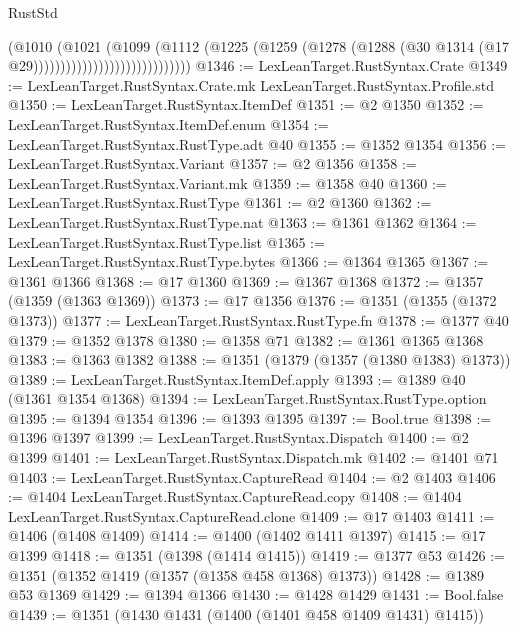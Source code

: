 \begin{lexlean}{RustStd}
\begin{coremodule}
{\begin{coremodule}
{{{{{{{{{{{{{{{{{{{{{{{{{{{{{{{{                                          (@1010
                                            (@1021
                                              (@1099
                                                (@1112
                                                  (@1225
                                                    (@1259
                                                      (@1278
                                                        (@1288
                                                          (@30
                                                            @1314
                                                            (@17 @29)))))))))))))))))))))))))))))
@1346 := LexLeanTarget.RustSyntax.Crate
@1349 := LexLeanTarget.RustSyntax.Crate.mk LexLeanTarget.RustSyntax.Profile.std
@1350 := LexLeanTarget.RustSyntax.ItemDef
@1351 := @2 @1350
@1352 := LexLeanTarget.RustSyntax.ItemDef.enum
@1354 := LexLeanTarget.RustSyntax.RustType.adt @40
@1355 := @1352 @1354
@1356 := LexLeanTarget.RustSyntax.Variant
@1357 := @2 @1356
@1358 := LexLeanTarget.RustSyntax.Variant.mk
@1359 := @1358 @40
@1360 := LexLeanTarget.RustSyntax.RustType
@1361 := @2 @1360
@1362 := LexLeanTarget.RustSyntax.RustType.nat
@1363 := @1361 @1362
@1364 := LexLeanTarget.RustSyntax.RustType.list
@1365 := LexLeanTarget.RustSyntax.RustType.bytes
@1366 := @1364 @1365
@1367 := @1361 @1366
@1368 := @17 @1360
@1369 := @1367 @1368
@1372 := @1357 (@1359 (@1363 @1369))
@1373 := @17 @1356
@1376 := @1351 (@1355 (@1372 @1373))
@1377 := LexLeanTarget.RustSyntax.RustType.fn
@1378 := @1377 @40
@1379 := @1352 @1378
@1380 := @1358 @71
@1382 := @1361 @1365 @1368
@1383 := @1363 @1382
@1388 := @1351 (@1379 (@1357 (@1380 @1383) @1373))
@1389 := LexLeanTarget.RustSyntax.ItemDef.apply
@1393 := @1389 @40 (@1361 @1354 @1368)
@1394 := LexLeanTarget.RustSyntax.RustType.option
@1395 := @1394 @1354
@1396 := @1393 @1395
@1397 := Bool.true
@1398 := @1396 @1397
@1399 := LexLeanTarget.RustSyntax.Dispatch
@1400 := @2 @1399
@1401 := LexLeanTarget.RustSyntax.Dispatch.mk
@1402 := @1401 @71
@1403 := LexLeanTarget.RustSyntax.CaptureRead
@1404 := @2 @1403
@1406 := @1404 LexLeanTarget.RustSyntax.CaptureRead.copy
@1408 := @1404 LexLeanTarget.RustSyntax.CaptureRead.clone
@1409 := @17 @1403
@1411 := @1406 (@1408 @1409)
@1414 := @1400 (@1402 @1411 @1397)
@1415 := @17 @1399
@1418 := @1351 (@1398 (@1414 @1415))
@1419 := @1377 @53
@1426 := @1351 (@1352 @1419 (@1357 (@1358 @458 @1368) @1373))
@1428 := @1389 @53 @1369
@1429 := @1394 @1366
@1430 := @1428 @1429
@1431 := Bool.false
@1439 := @1351 (@1430 @1431 (@1400 (@1401 @458 @1409 @1431) @1415))
}}}}}}}}}}}}}}}}}}}}}}}}}}}}}}}}
\end{coremodule}}
\end{coremodule}
\end{lexlean}
